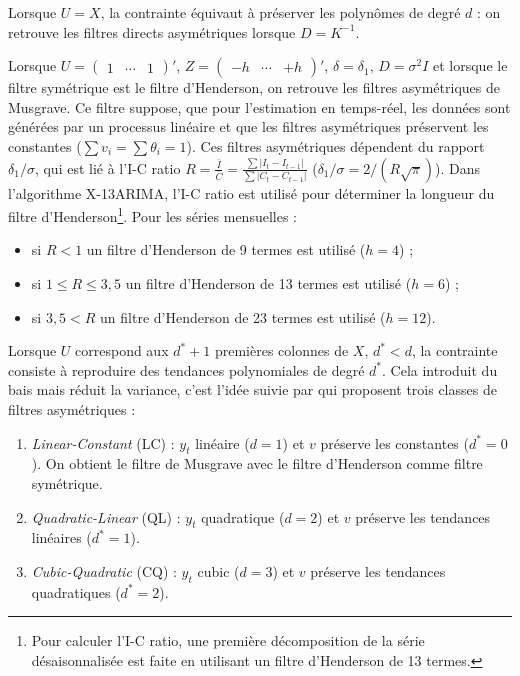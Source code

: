 \documentclass[
  11pt,
  french,
  a4paper]{article}
\newcommand\1{\mathds{1}}
\begin{document}
Lorsque \(U=X\), la contrainte équivaut à préserver les polynômes de degré \(d\) : on retrouve les filtres directs asymétriques lorsque \(D=K^{-1}\).

Lorsque \(U=\begin{pmatrix}1&\cdots&1\end{pmatrix}'\), \(Z=\begin{pmatrix}-h&\cdots&+h\end{pmatrix}'\), \(\delta=\delta_1\), \(D=\sigma^2I\) et lorsque le filtre symétrique est le filtre d'Henderson, on retrouve les filtres asymétriques de Musgrave.
Ce filtre suppose, que pour l'estimation en temps-réel, les données sont générées par un processus linéaire et que les filtres asymétriques préservent les constantes (\(\sum v_i=\sum \theta_i=1\)).
Ces filtres asymétriques dépendent du rapport \(\delta_1/\sigma\), qui est lié à l'I-C ratio \(R=\frac{\bar{I}}{\bar{C}}=\frac{\sum\lvert I_t-I_{t-1}\rvert}{\sum\lvert C_t-C_{t-1}\rvert}\) (\(\delta_1/\sigma=2/(R\sqrt{\pi})\)).
Dans l'algorithme X-13ARIMA, l'I-C ratio est utilisé pour déterminer la longueur du filtre d'Henderson\footnote{
  Pour calculer l'I-C ratio, une première décomposition de la série désaisonnalisée est faite en utilisant un filtre d'Henderson de 13 termes.}.
Pour les séries mensuelles :

\begin{itemize}
\item
  si \(R<1\) un filtre d'Henderson de 9 termes est utilisé (\(h=4\)) ;
\item
  si \(1\leq R\leq3,5\) un filtre d'Henderson de 13 termes est utilisé (\(h=6\)) ;
\item
  si \(3,5< R\) un filtre d'Henderson de 23 termes est utilisé (\(h=12\)).
\end{itemize}

Lorsque \(U\) correspond aux \(d^*+1\) premières colonnes de \(X\), \(d^*<d\), la contrainte consiste à reproduire des tendances polynomiales de degré \(d^*\).
Cela introduit du bais mais réduit la variance, c'est l'idée suivie par \textcite{proietti2008} qui proposent trois classes de filtres asymétriques :

\begin{enumerate}
\def\labelenumi{\arabic{enumi}.}
\item
  \emph{Linear-Constant} (LC) : \(y_t\) linéaire (\(d=1\)) et \(v\) préserve les constantes (\(d^*=0\)).
  On obtient le filtre de Musgrave avec le filtre d'Henderson comme filtre symétrique.
\item
  \emph{Quadratic-Linear} (QL) : \(y_t\) quadratique (\(d=2\)) et \(v\) préserve les tendances linéaires (\(d^*=1\)).
\item
  \emph{Cubic-Quadratic} (CQ) : \(y_t\) cubic (\(d=3\)) et \(v\) préserve les tendances quadratiques (\(d^*=2\)).
\end{enumerate}
\end{document}
